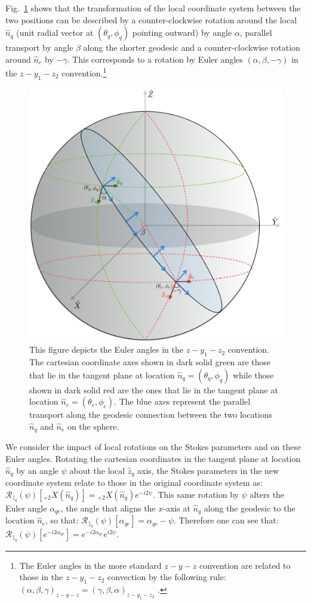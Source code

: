 \documentclass[a4paper,11pt]{article}
\def\fig#1{{Fig.~\ref{#1}}}
\begin{document}
\fig{fig:euler_angles} shows that the transformation of the local coordinate system between the two positions can be described by a counter-clockwise rotation around the local $\hat n_q$ (unit radial vector at $(\theta_q,\phi_q)$ pointing outward) by angle $\alpha$, parallel transport by angle $\beta$ along the shorter geodesic and a counter-clockwise rotation around $\hat n_e$ by $-\gamma$.  This corresponds to a rotation by Euler angles $(\alpha,\beta,-\gamma)$ in the $z-y_1-z_2$ convention.\footnote{The Euler angles in the more standard $z-y-z$ convention are related to those in the $z-y_1-z_2$ convection by the following rule: $(\alpha,\beta,\gamma)_{z-y-z} =(\gamma,\beta,\alpha)_{z-y_1-z_2}$ \cite{varshalovich}.}
%
\begin{figure}%
\centering
\includegraphics[width=0.5\columnwidth]{euler.pdf}
\caption{This figure depicts the Euler angles in the $z-y_1-z_2$ convention. The cartesian coordinate axes shown in dark solid green are those that lie in the tangent plane at location $\hat{n}_q = (\theta_q, \phi_q)$ while those shown in dark solid red are the ones that lie in the tangent plane at location $\hat{n}_e = (\theta_e, \phi_e)$. The blue axes represent the parallel transport along the geodesic connection between the two locations $\hat{n}_q$ and $\hat{n}_e$ on the sphere.}
\label{fig:euler_angles}
\end{figure}
%

We consider the impact of local rotations on the Stokes parameters and on these Euler angles. Rotating the cartesian coordinates in the tangent plane at location $\hat{n}_q$ by an angle $\psi$ about the local $\hat{z}_q$ axis, the Stokes parameters in the new coordinate system relate to those in the original coordinate system as:
$\mathcal{R}_{\hat{z}_q}(\psi)[{}_{+2}X(\hat{n}_q)] =  {}_{+2}X(\hat{n}_q) e^{-i2\psi} $.
This same rotation by $\psi$ alters the Euler angle $\alpha_{qe}$, the angle that aligns the $x$-axis at $\hat{n}_q$ along the geodesic to the location $\hat{n}_e$, so that: $\mathcal{R}_{\hat{z}_q}(\psi)[\alpha_{qe}] = \alpha_{qe} - \psi$.  Therefore one can see that: $\mathcal{R}_{\hat{z}_q}(\psi)[e^{-i2\alpha_{qe}}] =  e^{-i2\alpha_{qe}} e^{i2\psi}$.
\end{document}
